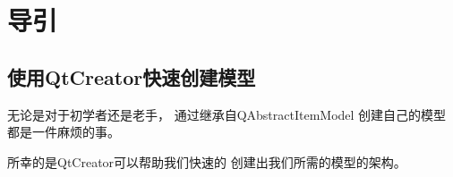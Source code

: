 ﻿





\FloatBarrier
\section{
导引
}\label{c000019s01}



\FloatBarrier
\subsection{
使用QtCreator快速创建模型
}\label{c000019s01s01}


无论是对于初学者还是老手，
通过继承自QAbstractItemModel
创建自己的模型都是一件麻烦的事。

所幸的是QtCreator可以帮助我们快速的
创建出我们所需的模型的架构。

